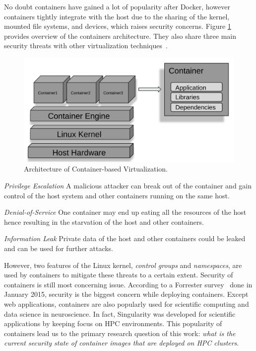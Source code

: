 \documentclass[a4paper,num-refs]{oup-contemporary}
\begin{document}
No doubt containers have gained a lot of popularity after Docker, however containers tightly
integrate with the host due to the sharing of the kernel, 
mounted file systems, and devices, which raises security
concerns. Figure \ref{fig:container-overview} provides overview of the containers architecture.
They also share three main security threats with other virtualization
techniques~\cite{gantikow2016providing}.

\begin{figure}
  \centering
  \includegraphics[width=.7\columnwidth]{Figures/container.png}
  \caption{Architecture of Container-based
                Virtualization.}
  \label{fig:container-overview}
\end{figure}

\textit{Privilege Escalation} A malicious attacker can break out of the container
and gain control of the host system and other containers running on the same host.

\textit{Denial-of-Service} One container may end up eating all the resources of the
host hence resulting in the starvation of the host and other containers.

\textit{Information Leak} Private data of the host and other containers could be
leaked and can be used for further attacks.


However, two features of the Linux kernel, \textit{control groups} and \textit{namespaces},
are used by containers to mitigate these threats to a certain extent. Security
of containers is still most concerning issue. According to a Forrester survey~\cite{} done in January
2015, security is the
biggest concern while deploying containers.
Except web applications, containers are also popularly used for scientific computing
and data science in neuroscience. In fact, Singularity was developed for scientific applications
by keeping focus on HPC environments. This popularity of containers lead us to the
primary research question of this work: \textit{what is the current security state of
container images that are deployed on HPC clusters}.
\end{document}
